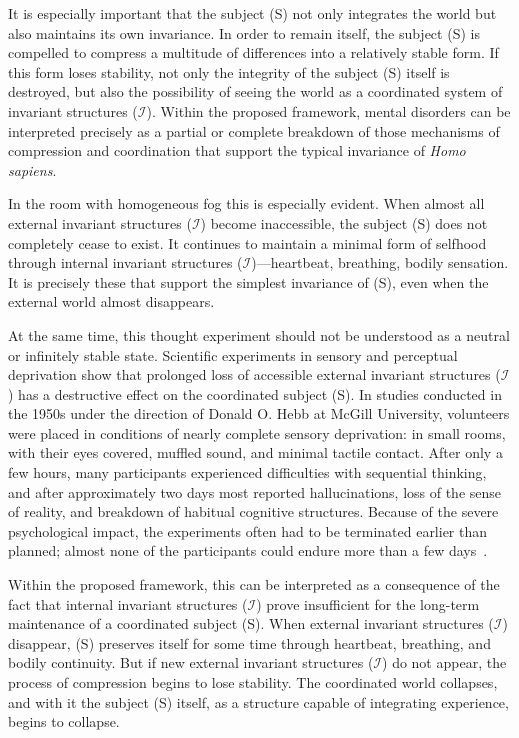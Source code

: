 \documentclass[aps,prd,onecolumn,nofootinbib,superscriptaddress]{revtex4-2} %
\begin{document}
    It is especially important that the subject (S) not only integrates the world but also maintains its own invariance. In order to remain itself, the subject (S) is compelled to compress a multitude of differences into a relatively stable form. If this form loses stability, not only the integrity of the subject (S) itself is destroyed, but also the possibility of seeing the world as a coordinated system of invariant structures ($\mathcal{I}$). Within the proposed framework, mental disorders can be interpreted precisely as a partial or complete breakdown of those mechanisms of compression and coordination that support the typical invariance of \emph{Homo sapiens}.

    In the room with homogeneous fog this is especially evident. When almost all external invariant structures ($\mathcal{I}$) become inaccessible, the subject (S) does not completely cease to exist. It continues to maintain a minimal form of selfhood through internal invariant structures ($\mathcal{I}$)—heartbeat, breathing, bodily sensation. It is precisely these that support the simplest invariance of (S), even when the external world almost disappears.

    At the same time, this thought experiment should not be understood as a neutral or infinitely stable state. Scientific experiments in sensory and perceptual deprivation show that prolonged loss of accessible external invariant structures ($\mathcal{I}$) has a destructive effect on the coordinated subject (S). In studies conducted in the 1950s under the direction of Donald O. Hebb at McGill University, volunteers were placed in conditions of nearly complete sensory deprivation: in small rooms, with their eyes covered, muffled sound, and minimal tactile contact. After only a few hours, many participants experienced difficulties with sequential thinking, and after approximately two days most reported hallucinations, loss of the sense of reality, and breakdown of habitual cognitive structures. Because of the severe psychological impact, the experiments often had to be terminated earlier than planned; almost none of the participants could endure more than a few days~\cite{Hebb1958}.

    Within the proposed framework, this can be interpreted as a consequence of the fact that internal invariant structures ($\mathcal{I}$) prove insufficient for the long-term maintenance of a coordinated subject (S). When external invariant structures ($\mathcal{I}$) disappear, (S) preserves itself for some time through heartbeat, breathing, and bodily continuity. But if new external invariant structures ($\mathcal{I}$) do not appear, the process of compression begins to lose stability. The coordinated world collapses, and with it the subject (S) itself, as a structure capable of integrating experience, begins to collapse.
\end{document}
